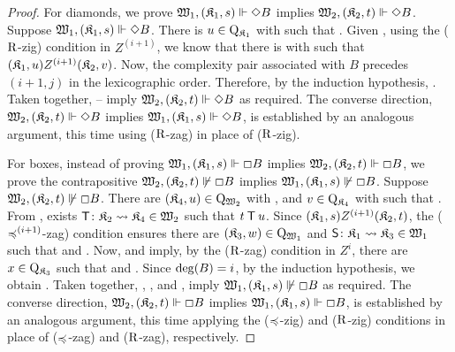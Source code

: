 \begin{proof}
	\medskip
    \noindent
    For diamonds, we prove $\xforces {\wmodel_1} {\pair {\kmodel_1} s} {\Diamond B}$ implies $\xforces {\wmodel_2} {\pair {\kmodel_2} t} {\Diamond B}$.
    Suppose $\xforces {\wmodel_1} {\pair {\kmodel_1} s} {\Diamond B}$.
    There is $u \in \Wkm[1]$ with  such that .
	Given , using the ($\R$-zig) condition in $Z^{(i+1)}$, we know that there is  with  such that ${\pair {\kmodel_1} u} Z^{(i+1)} {\pair {\kmodel_2} v}$.
	Now, the complexity pair associated with $B$ precedes $(i+1,j)$ in the lexicographic order.
	Therefore, by the induction hypothesis, .
	Taken together, -- imply $\xforces {\wmodel_2} {\pair {\kmodel_2} t} {\Diamond B}$ as required.
	The converse direction, $\xforces{\wmodel_2}{\pair{\kmodel_2}{t}}{\Diamond B}$ implies $\xforces{\wmodel_1}{\pair{\kmodel_1}{s}}{\Diamond B}$, is established by an analogous argument, this time using ($\R$-zag) in place of ($\R$-zig).

    \medskip
    \noindent
    For boxes, instead of proving $\xforces {\wmodel_1} {\pair {\kmodel_1} s} {\Box B}$ implies $\xforces {\wmodel_2} {\pair {\kmodel_2} t} {\Box B}$, we prove the contrapositive $\nxforces {\wmodel_2} {\pair {\kmodel_2} t} {\Box B}$ implies $\nxforces {\wmodel_1} {\pair {\kmodel_1} s} {\Box B}$.
    Suppose $\nxforces {\wmodel_2} {\pair {\kmodel_2} t} {\Box B}$.
    There are
		${\pair {\kmodel_4} u} \in \Qwm[2]$ with
			, and
		$v \in \Wkm[4]$ with
		such that
			.
	From , exists $\Tim\colon\kmodel_2 \fsim \kmodel_4 \in \wmodel_2$ such that $t \Tim u$.
	Since ${\pair {\kmodel_1} s} Z^{(i+1)} {\pair {\kmodel_2} t}$, the ($\Fsymb^{(i+1)}$-zag) condition ensures there are
		${\pair {\kmodel_3} w} \in \Qwm[1]$ and
		$\Sim\colon\kmodel_1 \fsim \kmodel_3 \in \wmodel_1$
		such that
			 and
			.
	Now,  and  imply, by the ($\R$-zag) condition in $Z^i$,
		there are
			$x \in \Wkm[3]$
			such that
				 and
				.
	Since $\ideg(B) = i$, by the induction hypothesis, we obtain
		.
	Taken together, , , and , imply $\nxforces {\wmodel_1} {\pair {\kmodel_1} s} {\Box B}$ as required.
    The converse direction, $\xforces{\wmodel_2}{\pair{\kmodel_2}{t}}{\Box B}$ implies $\xforces{\wmodel_1}{\pair{\kmodel_1}{s}}{\Box B}$, is established by an analogous argument, this time applying the ($\Fsymb$-zig) and ($\R$-zig) conditions in place of ($\Fsymb$-zag) and ($\R$-zag), respectively.
\end{proof}

